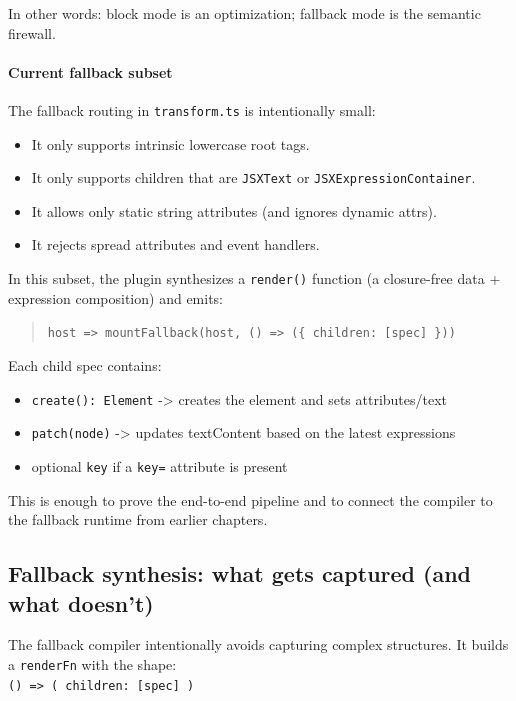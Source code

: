 In other words: block mode is an optimization; fallback mode is the semantic firewall.

\paragraph{Current fallback subset}

The fallback routing in \texttt{transform.ts} is intentionally small:

\begin{itemize}
\item It only supports intrinsic lowercase root tags.
\item It only supports children that are \texttt{JSXText} or \texttt{JSXExpressionContainer}.
\item It allows only static string attributes (and ignores dynamic attrs).
\item It rejects spread attributes and event handlers.
\end{itemize}

In this subset, the plugin synthesizes a \texttt{render()} function (a closure-free data + expression composition) and emits:

\begin{quote}
\texttt{host => mountFallback(host, () => (\{ children: [spec] \}))}
\end{quote}

Each child spec contains:

\begin{itemize}
\item \texttt{create(): Element} -> creates the element and sets attributes/text
\item \texttt{patch(node)} -> updates textContent based on the latest expressions
\item optional \texttt{key} if a \texttt{key=} attribute is present
\end{itemize}

This is enough to prove the end-to-end pipeline and to connect the compiler to the fallback runtime from earlier chapters.

\subsection{Fallback synthesis: what gets captured (and what doesn't)}

The fallback compiler intentionally avoids capturing complex structures.
It builds a \texttt{renderFn} with the shape:\\
	\texttt{() => ({ children: [spec] })}

